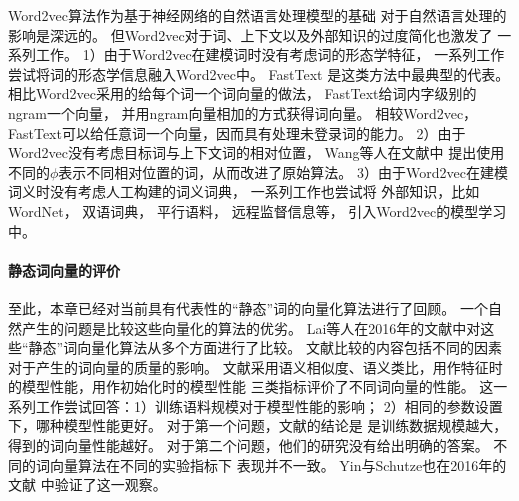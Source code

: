 Word2vec算法作为基于神经网络的自然语言处理模型的基础
对于自然语言处理的影响是深远的。
但Word2vec对于词、上下文以及外部知识的过度简化也激发了
一系列工作。
1）由于Word2vec在建模词时没有考虑词的形态学特征，
一系列工作尝试将词的形态学信息融入Word2vec中。
FastText\cite{Q17-1010}
是这类方法中最典型的代表。
相比Word2vec采用的给每个词一个词向量的做法，
FastText给词内字级别的ngram一个向量，
并用ngram向量相加的方式获得词向量。
相较Word2vec，
FastText可以给任意词一个向量，因而具有处理未登录词的能力。
2）由于Word2vec没有考虑目标词与上下文词的相对位置，
Wang等人在文献中
提出使用不同的$\phi$表示不同相对位置的词，从而改进了原始算法。
3）由于Word2vec在建模词义时没有考虑人工构建的词义词典，
一系列工作也尝试将
外部知识，比如WordNet\cite{rothe-schutze:2015:ACL-IJCNLP}，
双语词典\cite{DBLP:journals/corr/SmithTHH17}，
平行语料\cite{AAAI1612236}，
远程监督信息\cite{tang-EtAl:2014:P14-1}等，
引入Word2vec的模型学习中。

\paragraph{静态词向量的评价}
至此，本章已经对当前具有代表性的``静态''词的向量化算法进行了回顾。
一个自然产生的问题是比较这些向量化的算法的优劣。
Lai等人在2016年的文献中对这些``静态''词向量化算法从多个方面进行了比较。
文献比较的内容包括不同的因素对于产生的词向量的质量的影响。
文献采用语义相似度、语义类比，用作特征时的模型性能，用作初始化时的模型性能
三类指标评价了不同词向量的性能。
这一系列工作尝试回答：1）训练语料规模对于模型性能的影响；
2）相同的参数设置下，哪种模型性能更好。
对于第一个问题，文献的结论是
是训练数据规模越大，得到的词向量性能越好。
对于第二个问题，他们的研究没有给出明确的答案。
不同的词向量算法在不同的实验指标下
表现并不一致。
Yin与Schutze也在2016年的文献
中验证了这一观察。

